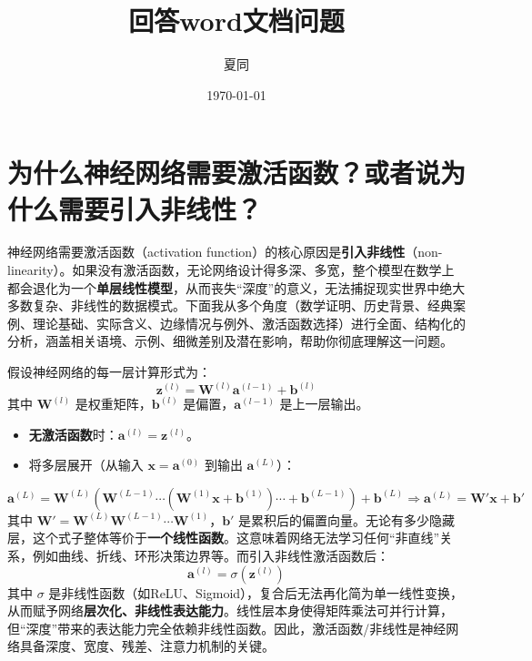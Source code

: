 \documentclass[12pt,a4paper,UTF8]{ctexart}
\title{回答word文档问题}
\author{夏同}
\date{\today}
\begin{document}
\maketitle

\tableofcontents

\section{为什么神经网络需要激活函数？或者说为什么需要引入非线性？}

神经网络需要激活函数（activation function）的核心原因是\textbf{引入非线性}（non-linearity）。如果没有激活函数，无论网络设计得多深、多宽，整个模型在数学上都会退化为一个\textbf{单层线性模型}，从而丧失“深度”的意义，无法捕捉现实世界中绝大多数复杂、非线性的数据模式。下面我从多个角度（数学证明、历史背景、经典案例、理论基础、实际含义、边缘情况与例外、激活函数选择）进行全面、结构化的分析，涵盖相关语境、示例、细微差别及潜在影响，帮助你彻底理解这一问题。

假设神经网络的每一层计算形式为：
\begin{equation}
\mathbf{z}^{(l)} = \mathbf{W}^{(l)} \mathbf{a}^{(l-1)} + \mathbf{b}^{(l)}
\end{equation}
其中 \(\mathbf{W}^{(l)}\) 是权重矩阵，\(\mathbf{b}^{(l)}\) 是偏置，\(\mathbf{a}^{(l-1)}\) 是上一层输出。
\begin{itemize}
    \item \textbf{无激活函数}时：\(\mathbf{a}^{(l)} = \mathbf{z}^{(l)}\)。
    \item 将多层展开（从输入 \(\mathbf{x} = \mathbf{a}^{(0)}\) 到输出 \(\mathbf{a}^{(L)}\)）：
\end{itemize}
\begin{equation}
\mathbf{a}^{(L)} = \mathbf{W}^{(L)} \left( \mathbf{W}^{(L-1)} \cdots (\mathbf{W}^{(1)} \mathbf{x} + \mathbf{b}^{(1)}) \cdots + \mathbf{b}^{(L-1)} \right) + \mathbf{b}^{(L)}\Rightarrow \mathbf{a}^{(L)} = \mathbf{W}' \mathbf{x} + \mathbf{b}'
\end{equation}
其中 \(\mathbf{W}' = \mathbf{W}^{(L)} \mathbf{W}^{(L-1)} \cdots \mathbf{W}^{(1)}\)，\(\mathbf{b}'\) 是累积后的偏置向量。无论有多少隐藏层，这个式子整体等价于\textbf{一个线性函数}。这意味着网络无法学习任何“非直线”关系，例如曲线、折线、环形决策边界等。而引入非线性激活函数后：
\[
\mathbf{a}^{(l)} = \sigma(\mathbf{z}^{(l)})
\]
其中 \(\sigma\) 是非线性函数（如ReLU、Sigmoid），复合后无法再化简为单一线性变换，从而赋予网络\textbf{层次化、非线性表达能力}。线性层本身使得矩阵乘法可并行计算，但“深度”带来的表达能力完全依赖非线性函数。因此，激活函数/非线性是神经网络具备深度、宽度、残差、注意力机制的关键。
\end{document}
